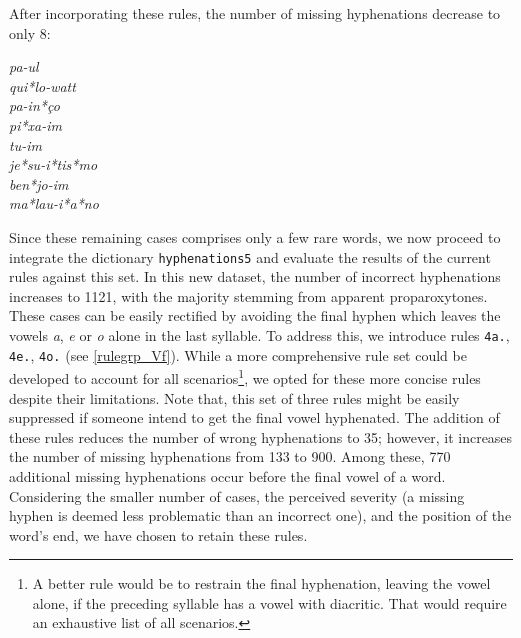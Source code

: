 After incorporating these rules, the number of missing hyphenations decrease to only 8:
\begin{multicols}{5}
\setlength{\columnsep}{0pt}
\setlength{\parindent}{0pt}
\emph{pa-ul \\ qui*lo-watt \\ pa-in*ço \\ pi*xa-im \\ tu-im \\ je*su-i*tis*mo \\  ben*jo-im  \\  ma*lau-i*a*no}
\end{multicols}
\noindent{}Since these remaining cases comprises only a few rare words, we now proceed to integrate the dictionary \texttt{hyphenations5} and 
evaluate the results of the current rules against this set. 
In this new dataset, the number of incorrect hyphenations
increases to 1121, with the majority stemming from apparent proparoxytones. These cases can be easily rectified by
avoiding the final hyphen which leaves the vowels \emph{a}, \emph{e} or \emph{o} alone in the last syllable.
To address this, we introduce rules \texttt{4a.}, \texttt{4e.}, \texttt{4o.} (see \cref{rulegrp_Vf}).
While a more comprehensive rule set could be developed to account for all scenarios\footnote{A better rule would be to restrain the final hyphenation, leaving the vowel alone, if the preceding syllable has a vowel with diacritic. That would require an exhaustive list of all scenarios.}, we opted for these more concise rules despite their limitations.
Note that, this set of three rules might be easily suppressed if someone intend to get the final vowel hyphenated.
The addition of these rules reduces the number of wrong hyphenations to 35; however, it increases the number of missing hyphenations 
from 133 to 900. Among these, 770 additional missing hyphenations occur
before the final vowel of a word.
Considering the smaller number of cases, the perceived severity (a missing hyphen is deemed less problematic than an incorrect one), 
and the position of the word's end, we have chosen to retain these rules.

